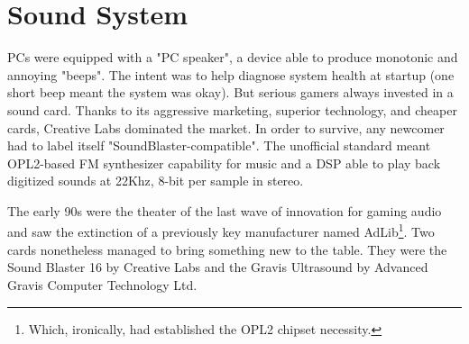 \section{Sound System}
PCs were equipped with a "PC speaker", a device able to produce monotonic and annoying "beeps". The intent was to help diagnose system health at startup (one short beep meant the system was okay). But serious gamers always invested in a sound card. Thanks to its aggressive marketing, superior technology, and cheaper cards, Creative Labs dominated the market. In order to survive, any newcomer had to label itself "SoundBlaster-compatible". The unofficial standard meant OPL2-based FM synthesizer capability for music and a DSP able to play back digitized sounds at 22Khz, 8-bit per sample in stereo.\\
\par
 The early 90s were the theater of the last wave of innovation for gaming audio and saw the extinction of a previously key manufacturer named AdLib\footnote{Which, ironically, had established the OPL2 chipset necessity.}. Two cards nonetheless managed to bring something new to the table. They were the Sound Blaster 16 by Creative Labs and the Gravis Ultrasound by Advanced Gravis Computer Technology Ltd.\\

\vspace{-2mm}
